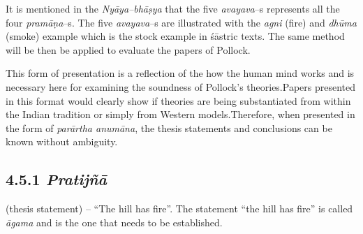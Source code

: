 It is mentioned in the \textit{Nyāya–bhāṣya} that the five \textit{avayava}–s represents all the four \textit{pramāṇa}–s. The five \textit{avayava}–s are illustrated with the \textit{agni} (fire) and \textit{dhūma} (smoke) example which is the stock example in śāstric texts. The same method will be then be applied to evaluate the papers of Pollock.

This form of presentation is a reflection of the how the human mind works and is necessary here for examining the soundness of Pollock’s theories.Papers presented in this format would clearly show if theories are being substantiated from within the Indian tradition or simply from Western models.Therefore, when presented in the form of \textit{parārtha anumāna}, the thesis statements and conclusions can be known without ambiguity.

\vspace{-.3cm}

\subsection*{4.5.1 {\it {\bfseries Pratijñā}}}

\vspace{-.3cm}

(thesis statement) – “The hill has fire”. The statement “the hill has fire” is called \textit{āgama} and is the one that needs to be established.

